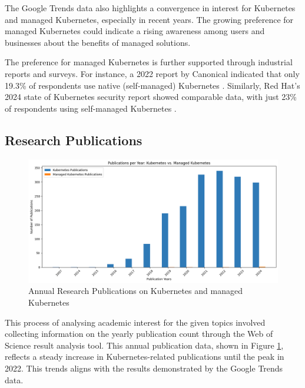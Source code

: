 The Google Trends data also highlights a convergence in interest for Kubernetes and managed Kubernetes, especially in recent years. The growing preference for managed Kubernetes could indicate a rising awareness among users and businesses about the benefits of managed solutions.

The preference for managed Kubernetes is further supported through industrial reports and surveys. For instance, a 2022 report by Canonical indicated that only 19.3\% of respondents use native (self-managed) Kubernetes \cite{canonicalKubernetesCloudNative2022}. Similarly, Red Hat's 2024 state of Kubernetes security report showed comparable data, with just 23\% of respondents using self-managed Kubernetes \cite{redhatinc.StateKubernetesSecurity2024}.

\subsection{Research Publications}

\FloatBarrier

\begin{figure}
    \centering
    \includegraphics[width=1\linewidth]{resources/55ccf3419c03248ff5a2383d4ae63366.png}
    \caption{Annual Research Publications on Kubernetes and managed Kubernetes}
    \label{fig:research-publications-kubernetes-and-managed-kubernetes}
\end{figure}


This process of analysing academic interest for the given topics involved collecting information on the yearly publication count through the Web of Science result analysis tool. This annual publication data, shown in Figure \ref{fig:research-publications-kubernetes-and-managed-kubernetes}, reflects a steady increase in Kubernetes-related publications until the peak in 2022. This trends aligns with the results demonstrated by the Google Trends data.


